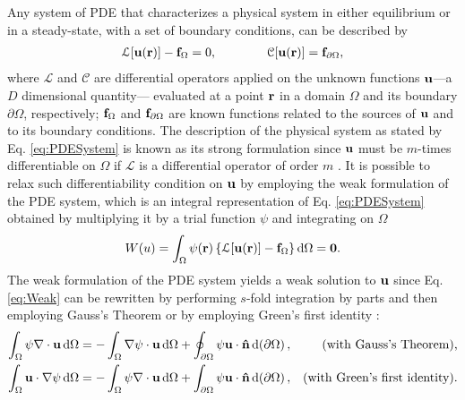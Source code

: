 
Any system of PDE that characterizes a physical system in either equilibrium or in a steady-state, with a set of boundary conditions, can be described by \cite{dhatt_finite_2012}
%
%
%
%
\begin{align}
    \mathcal{L}[\vb{u}(\vb{r})] - \vb{f}_\Omega = 0,
    \qquad\qquad
    \mathcal{C}[\vb{u}(\vb{r})] = \vb{f}_{\partial\Omega},
\label{eq:PDESystem}
\end{align}
%
where $\mathcal{L}$ and $\mathcal{C}$ are differential operators applied on the unknown functions $\vb{u}$---a $D$ dimensional quantity--- evaluated at a point $\vb{r}$ in a domain $\Omega$ and its boundary $\partial\Omega$, respectively;  $\vb{f}_\Omega$ and $\vb{f}_{\partial\Omega}$ are known functions related to the sources of $\vb{u}$ and to its boundary conditions.  The description of the physical system as stated by Eq. \eqref{eq:PDESystem} is known as its strong formulation since $\vb{u}$ must be $m$-times differentiable on $\Omega$ if $\mathcal{L}$ is a differential operator of order $m$ \cite{dhatt_finite_2012,larson_finite_2013}. It is possible to relax such differentiability condition on $\vb{u}$ by employing the weak formulation of the PDE system, which is an integral representation of Eq. \eqref{eq:PDESystem} obtained by multiplying it by a trial function $\psi$ and integrating on $\Omega$ \cite{dhatt_finite_2012,larson_finite_2013,fletcher_computational_1984}
%
%
%
%
%
%
%
\begin{align}
    W(u) = \int_\Omega \psi(\vb{r}) \left\{ \mathcal{L}[\vb{u}(\vb{r})] - \vb{f}_\Omega   \right\} \dd{\Omega} = \vb{0}.
    \label{eq:Weak}
\end{align}
%
The weak formulation of the PDE system yields a weak solution to $\vb{u}$ since Eq. \eqref{eq:Weak} can be rewritten by performing $s$-fold integration by parts and then  employing Gauss's Theorem or by employing Green's first identity \cite{larson_finite_2013}:
%
%
%
%
%
\begin{align}
    \int_\Omega \psi \nabla\cdot \vb{u}\dd{\Omega} &=  - \int_\Omega \nabla\psi \cdot \vb{u} \dd{\Omega} + \oint_{\partial\Omega} \psi \vb{u}\cdot \vu{n}\dd{(\partial\Omega)},
        & \mbox{(with Gauss's Theorem),}
        \label{eq:GT}
    \\
    \int_\Omega \vb{u}\cdot\nabla\psi \dd{\Omega} &=  - \int_\Omega \psi \nabla\cdot \vb{u}\dd{\Omega}  + \int_{\partial \Omega}\psi \vb{u}\cdot\vu{n}\dd{(\partial\Omega)},
        & \mbox{(with Green's first identity).}
        \label{eq:G1I}
\end{align}
